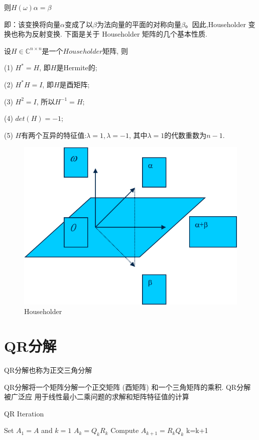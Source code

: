 则$H(\omega )\alpha  = \beta $

即：该变换将向量$\alpha$变成了以$\beta$为法向量的平面的对称向量$\beta$。因此,Householder 变换也称为反射变换.
\newpage
下面是关于 Householder 矩阵的几个基本性质.
\begin{theo}
设$H\in \mathbb{C}^{n\times n}$是一个$Householder$矩阵,
则

(1) $H^{\ast}=H$, 即$H$是Hermite的;

(2) $H^{\ast}H=I$, 即$H$是酉矩阵;

(3) $H^{2}=I$, 所以$H^{-1} = H$;

(4) $det(H) = −1$;

(5) $H$有两个互异的特征值:$\lambda= 1,\lambda= −1$,
其中$\lambda=1$的代数重数为$n − 1$.
\end{theo}

\begin{figure}[ht]
\small
\centering
\includegraphics[width=12cm]{1.png}
\caption{Householder} \label{fig:1}
\end{figure}

\newpage
\section{QR分解}
QR分解也称为正交三角分解

QR分解将一个矩阵分解一个正交矩阵 (酉矩阵) 和一个三角矩阵的乘积. QR分解被广泛应
用于线性最小二乘问题的求解和矩阵特征值的计算

\begin{algorithm}[h]  
\caption{QR Iteration}  
\begin{algorithmic}[1]  
\STATE Set $A_1=A$ and $k=1$
\STATE ${A_{k}} = Q_k R_k$
\STATE Compute $A_{k+1}=R_k Q_k$
\STATE k=k+1
\ENDWHILE
\end{algorithmic}  
\end{algorithm}  

